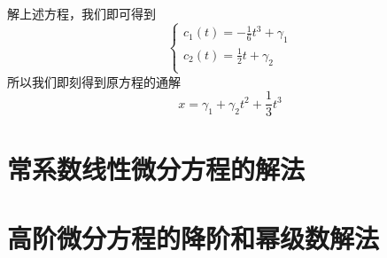 \documentclass[aspectratio=169, 10pt, utf8, mathserif]{beamer}
\begin{document}
	\begin{frame}
		解上述方程，我们即可得到
		\begin{equation*}
			\begin{cases}
				c_1(t)=-\frac{1}{6}t^3+\gamma _1\\
				c_2(t)=\frac{1}{2}t+\gamma _2\\
			\end{cases}
		\end{equation*}
		所以我们即刻得到原方程的通解
		\begin{equation*}
			x=\gamma_1+\gamma_2t^2+\frac13t^3
		\end{equation*}
	\end{frame}
	
	\section{常系数线性微分方程的解法}
	\section{高阶微分方程的降阶和幂级数解法}
	\begin{frame}
	\end{frame}
\end{document}
